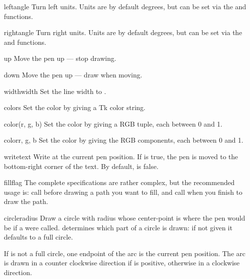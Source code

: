 \begin{funcdesc}{left}{angle}
Turn left  units. Units are by default degrees, but can be
set via the  and  functions.
\end{funcdesc}

\begin{funcdesc}{right}{angle}
Turn right  units. Units are by default degrees, but can be
set via the  and  functions.
\end{funcdesc}

\begin{funcdesc}{up}{}
Move the pen up --- stop drawing.
\end{funcdesc}

\begin{funcdesc}{down}{}
Move the pen up --- draw when moving.
\end{funcdesc}

\begin{funcdesc}{width}{width}
Set the line width to .
\end{funcdesc}

\begin{funcdesc}{color}{s}
Set the color by giving a Tk color string.
\end{funcdesc}

\begin{funcdesc}{color}{(r, g, b)}
Set the color by giving a RGB tuple, each between 0 and 1.
\end{funcdesc}

\begin{funcdesc}{color}{r, g, b}
Set the color by giving the RGB components, each between 0 and 1.
\end{funcdesc}

\begin{funcdesc}{write}{text}
Write  at the current pen position. If  is true,
the pen is moved to the bottom-right corner of the text. By default,
 is false.
\end{funcdesc}

\begin{funcdesc}{fill}{flag}
The complete specifications are rather complex, but the recommended 
usage is: call  before drawing a path you want to fill,
and call  when you finish to draw the path.
\end{funcdesc}

\begin{funcdesc}{circle}{radius}
Draw a circle with radius  whose center-point is where the 
pen would be if a  were
called.  determines which part of a circle is drawn: if
not given it defaults to a full circle.

If  is not a full circle, one endpoint of the arc is the
current pen position. The arc is drawn in a counter clockwise
direction if  is positive, otherwise in a clockwise
direction.
\end{funcdesc}

